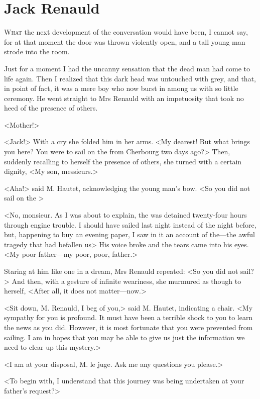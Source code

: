 \chapter{Jack Renauld}

\lettrine{W}{hat} the next development of the conversation would have been, I cannot say, for at that moment the door was thrown violently open, and a tall young man strode into the room. 

\zz
 Just for a moment I had the uncanny sensation that the dead man had come to life again. Then I realized that this dark head was untouched with grey, and that, in point of fact, it was a mere boy who now burst in among us with so little ceremony. He went straight to Mrs Renauld with an impetuosity that took no heed of the presence of others. 

 <Mother!> 

 <Jack!> With a cry she folded him in her arms. <My dearest! But what brings you here? You were to sail on the  from Cherbourg two days ago?> Then, suddenly recalling to herself the presence of others, she turned with a certain dignity, <My son, messieurs.> 

 <Aha!> said M. Hautet, acknowledging the young man's bow. <So you did not sail on the > 

 <No, monsieur. As I was about to explain, the  was detained twenty-four hours through engine trouble. I should have sailed last night instead of the night before, but, happening to buy an evening paper, I saw in it an account of the—the awful tragedy that had befallen us\longdash> His voice broke and the tears came into his eyes. <My poor father—my poor, poor, father.> 

 Staring at him like one in a dream, Mrs Renauld repeated: <So you did not sail?> And then, with a gesture of infinite weariness, she murmured as though to herself, <After all, it does not matter—now.> 

 <Sit down, M. Renauld, I beg of you,> said M. Hautet, indicating a chair. <My sympathy for you is profound. It must have been a terrible shock to you to learn the news as you did. However, it is most fortunate that you were prevented from sailing. I am in hopes that you may be able to give us just the information we need to clear up this mystery.> 

 <I am at your disposal, M. le juge. Ask me any questions you please.> 

 <To begin with, I understand that this journey was being undertaken at your father's request?> 

